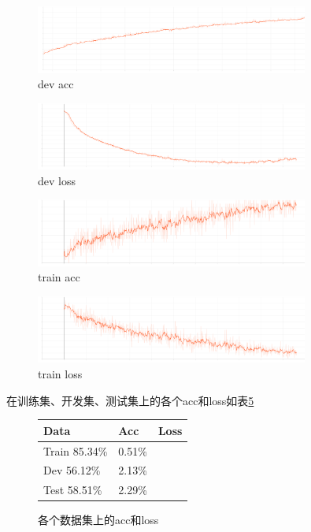 \documentclass{article}
\begin{document}
\begin{figure}[H]
    \centering
    \includegraphics[width=0.8\textwidth]{figures/dev_acc.png}
    \caption{dev acc}
    \label{devacc}
\end{figure}

\begin{figure}[H]
    \centering
    \includegraphics[width=0.8\textwidth]{figures/dev_loss.png}
    \caption{dev loss}
    \label{devloss}
\end{figure}

\begin{figure}[H]
    \centering
    \includegraphics[width=0.8\textwidth]{figures/train_acc.png}
    \caption{train acc}
    \label{trainacc}
\end{figure}

\begin{figure}[H]
    \centering
    \includegraphics[width=0.8\textwidth]{figures/train_loss.png}
    \caption{train loss}
    \label{trainloss}
\end{figure}

在训练集、开发集、测试集上的各个acc和loss如表\ref{test}

\begin{figure}[H]
    \centering
    \begin{tabular}{lll}
        \hline
        \textbf{Data}        & \textbf{Acc} & \textbf{Loss} \\
        \hline
        Train        85.34\% & 0.51\%                       \\
        Dev          56.12\% & 2.13\%                       \\
        Test         58.51\% & 2.29\%                       \\
        \hline
    \end{tabular}
    \caption{各个数据集上的acc和loss}
    \label{test}
\end{figure}
\end{document}
